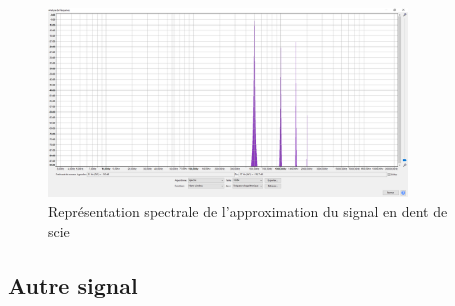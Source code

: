 \documentclass[a4paper]{article}
\begin{document}
\begin{figure}[H]
    \centering
    \includegraphics[width=0.85\textwidth]{images/DentScie019.PNG}
    \caption{Représentation spectrale de l'approximation du signal en dent de scie}
    \label{fig:DentScie019}
\end{figure}











\subsection{Autre signal}
\end{document}
